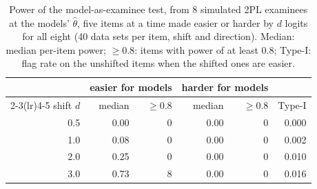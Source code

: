 \begin{table}[t]
\caption{Power of the model-as-examinee test, from 8 simulated 2PL examinees at the models' $\hat\theta$, five items at a time made easier or harder by $d$ logits for all eight (40 data sets per item, shift and direction). Median: median per-item power; $\ge 0.8$: items with power of at least 0.8; Type-I: flag rate on the unshifted items when the shifted ones are easier.}
\label{tab:power}\centering\setlength{\tabcolsep}{4pt}
\begin{tabular}{rrrrrr}\toprule
 & \multicolumn{2}{c}{easier for models} & \multicolumn{2}{c}{harder for models} & \\\cmidrule(lr){2-3}\cmidrule(lr){4-5}
shift $d$ & median & $\ge 0.8$ & median & $\ge 0.8$ & Type-I \\\midrule
0.5 & 0.00 & 0 & 0.00 & 0 & 0.000 \\
1.0 & 0.08 & 0 & 0.00 & 0 & 0.002 \\
2.0 & 0.25 & 0 & 0.00 & 0 & 0.010 \\
3.0 & 0.73 & 8 & 0.00 & 0 & 0.016 \\
\bottomrule\end{tabular}\end{table}
